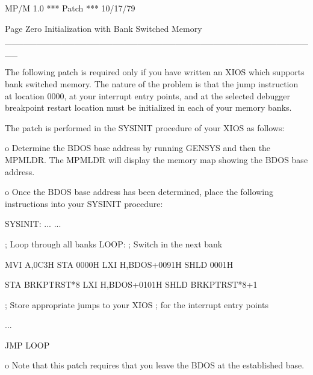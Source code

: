      MP/M 1.0  *** Patch ***  10/17/79

     Page Zero Initialization with Bank Switched Memory
     __________________________________________________

     The following patch is required only if you have written
an XIOS which supports bank switched memory.  The nature of
the problem is that the jump instruction at location 0000,
at your interrupt entry points, and at the selected debugger
breakpoint restart location must be initialized in each of
your memory banks.

     The patch is performed in the SYSINIT procedure of your
XIOS as follows:

     o Determine the BDOS base address by running GENSYS and
       then the MPMLDR.  The MPMLDR will display the memory map
       showing the BDOS base address.

     o Once the BDOS base address has been determined, place the
       following instructions into your SYSINIT procedure:

       SYSINIT:
               ...
               ...

       ; Loop through all banks
       LOOP:
               ; Switch in the next bank

               MVI     A,0C3H
               STA     0000H
               LXI     H,BDOS+0091H
               SHLD    0001H

               STA     BRKPTRST*8
               LXI     H,BDOS+0101H
               SHLD    BRKPTRST*8+1

               ; Store appropriate jumps to your XIOS
               ;   for the interrupt entry points

               ...

               JMP     LOOP

     o Note that this patch requires that you leave the BDOS
       at the established base.

